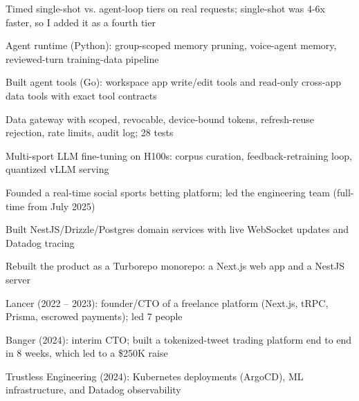 \documentclass[print]{jack-resume}
\begin{document}
\begin{tightemize}
    \item Timed single-shot vs. agent-loop tiers on real requests; single-shot was 4-6x faster, so I added it as a fourth tier
    \item Agent runtime (Python): group-scoped memory pruning, voice-agent memory, reviewed-turn training-data pipeline
    \item Built agent tools (Go): workspace app write/edit tools and read-only cross-app data tools with exact tool contracts
    \item Data gateway with scoped, revocable, device-bound tokens, refresh-reuse rejection, rate limits, audit log; 28 tests
    \item Multi-sport LLM fine-tuning on H100s: corpus curation, feedback-retraining loop, quantized vLLM serving
\end{tightemize}
\sectionsep

\begin{tightemize}
    \item Founded a real-time social sports betting platform; led the engineering team (full-time from July 2025)
    \item Built NestJS/Drizzle/Postgres domain services with live WebSocket updates and Datadog tracing
    \item Rebuilt the product as a Turborepo monorepo: a Next.js web app and a NestJS server
\end{tightemize}
\sectionsep

\begin{tightemize}
    \item Lancer (2022 -- 2023): founder/CTO of a freelance platform (Next.js, tRPC, Prisma, escrowed payments); led 7 people
    \item Banger (2024): interim CTO; built a tokenized-tweet trading platform end to end in 8 weeks, which led to a \$250K raise
    \item Trustless Engineering (2024): Kubernetes deployments (ArgoCD), ML infrastructure, and Datadog observability
\end{tightemize}
\sectionsep
\end{document}
